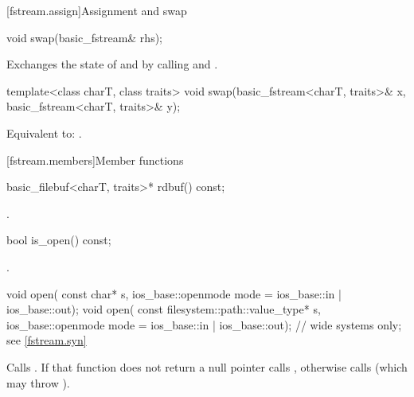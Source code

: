 [fstream.assign]{Assignment and swap}

%
\begin{itemdecl}
void swap(basic_fstream& rhs);
\end{itemdecl}

\begin{itemdescr}
\pnum
\effects
Exchanges the state of 
and  by calling
 and
.
\end{itemdescr}

%
\begin{itemdecl}
template<class charT, class traits>
  void swap(basic_fstream<charT, traits>& x,
            basic_fstream<charT, traits>& y);
\end{itemdecl}

\begin{itemdescr}
\pnum
\effects
Equivalent to: .
\end{itemdescr}

[fstream.members]{Member functions}

%
\begin{itemdecl}
basic_filebuf<charT, traits>* rdbuf() const;
\end{itemdecl}

\begin{itemdescr}
\pnum
\returns
{}.
\end{itemdescr}

%
\begin{itemdecl}
bool is_open() const;
\end{itemdecl}

\begin{itemdescr}
\pnum
\returns
{}.
\end{itemdescr}

%
\begin{itemdecl}
void open(
  const char* s,
  ios_base::openmode mode = ios_base::in | ios_base::out);
void open(
  const filesystem::path::value_type* s,
  ios_base::openmode mode = ios_base::in | ios_base::out);  // wide systems only; see \ref{fstream.syn}
\end{itemdecl}

\begin{itemdescr}
\pnum
\effects
Calls
.
If that function does not return a null pointer calls ,
otherwise calls
(which may throw
).
\end{itemdescr}

